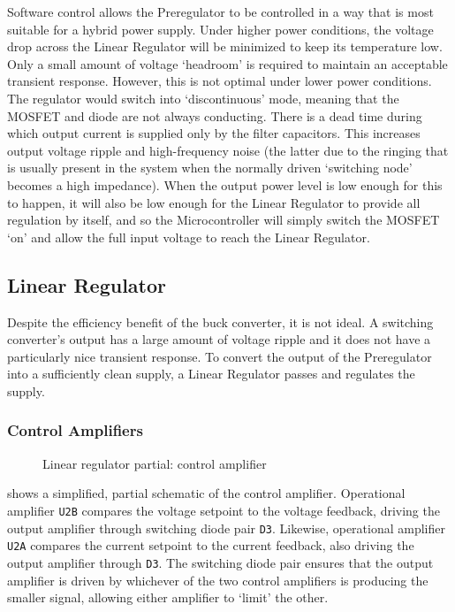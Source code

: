 \documentclass[letterpaper,twocolumn,10pt,openany,oneside,final,fleqn]{memoir}
\newcommand{\rd}[1]{\texttt{#1}}
\newcommand{\xcircuit}[1]{ \centering \textsf{  } }
\begin{document}
Software control allows the Preregulator to be controlled in a way that is most suitable
for a hybrid power supply. Under higher power conditions, the voltage drop across the Linear
Regulator will be minimized to keep its temperature low. Only a small amount of voltage
`headroom' is required to maintain an acceptable transient response. However, this is not
optimal under lower power conditions. The regulator would switch into `discontinuous' mode,
meaning that the MOSFET and diode are not always conducting. There is a dead time during
which output current is supplied only by the filter capacitors. This increases output voltage
ripple and high-frequency noise (the latter due to the ringing that is usually present in
the system when the normally driven `switching node' becomes a high impedance). When the
output power level is low enough for this to happen, it will also be low enough for the
Linear Regulator to provide all regulation by itself, and so the Microcontroller will
simply switch the MOSFET `on' and allow the full input voltage to reach the Linear Regulator.

\subsection{Linear Regulator}

Despite the efficiency benefit of the buck converter, it is not ideal. A switching converter's
output has a large amount of voltage ripple and it does not have a particularly nice transient
response. To convert the output of the Preregulator into a sufficiently clean supply, a Linear
Regulator passes and regulates the supply.

\subsubsection{Control Amplifiers}

\begin{figure}
\xcircuit{control358}
\caption{Linear regulator partial: control amplifier}
\label{fig:controlamp}
\end{figure}

 shows a simplified, partial schematic of the control amplifier.
Operational amplifier \rd{U2B} compares the voltage setpoint to the voltage feedback,
driving the output amplifier through switching diode pair \rd{D3}. Likewise, operational
amplifier \rd{U2A} compares the current setpoint to the current feedback, also driving
the output amplifier through \rd{D3}. The switching diode pair ensures that the output
amplifier is driven by whichever of the two control amplifiers is producing the smaller
signal, allowing either amplifier to `limit' the other.
\end{document}
